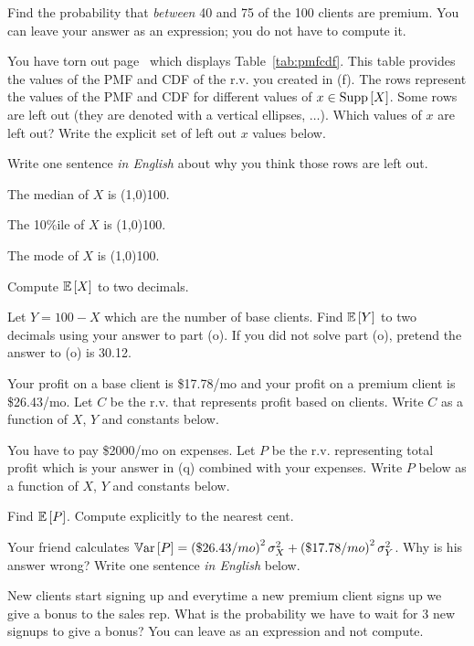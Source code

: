 \documentclass[12pt]{article}
\begin{document}
 Find the probability that \textit{between} 40 and 75 of the 100 clients are premium. You can leave your answer as an expression; you do not have to compute it.  

 You have torn out page~\pageref{tab:pmfcdf} which displays Table~\ref{tab:pmfcdf}. This table provides the values of the PMF and CDF of the r.v. you created in (f). The rows represent the values of the PMF and CDF for different values of $x \in \text{Supp}\left[X\right]$. Some rows are left out (they are denoted with a vertical ellipses, $\ldots$). Which values of $x$ are left out? Write the explicit set of left out $x$ values below. 

 Write one sentence \textit{in English} about why you think those rows are left out. 

 The median of $X$ is \line(1,0){100}. 

 The 10\%ile of $X$ is \line(1,0){100}. 

 The mode of $X$ is \line(1,0){100}.

 Compute $\mathbb{E}\left[X\right]$ to two decimals. 

 Let $Y=100 - X$ which are the number of base clients. Find $\mathbb{E}\left[Y\right]$ to two decimals using your answer to part (o). If you did not solve part (o), pretend the answer to (o) is 30.12. 

 Your profit on a base client is \$17.78/mo and your profit on a premium client is \$26.43/mo. Let $C$ be the r.v. that represents profit based on clients. Write $C$ as a function of $X$, $Y$ and constants below. 

 You have to pay \$2000/mo on expenses. Let $P$ be the r.v. representing total profit which is your answer in (q) combined with your expenses. Write $P$ below as a function of $X$, $Y$ and constants below. 

 Find $\mathbb{E}\left[P\right]$. Compute explicitly to the nearest cent. 

 Your friend calculates $\mathbb{V}\text{ar}\left[P\right] = \left(\$26.43/mo\right)^2 \sigma^2_X +  \left(\$17.78/mo\right)^2 \sigma^2_Y$. Why is his answer wrong? Write one sentence \textit{in English} below. 

 New clients start signing up and everytime a new premium client signs up we give a bonus to the sales rep. What is the probability we have to wait for 3 new signups to give a bonus? You can leave as an expression and not compute. 
\end{document}

